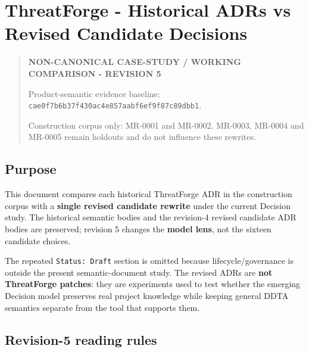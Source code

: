 \documentclass[
  10pt,
]{article}
\author{}
\date{}
\begin{document}
\section{ThreatForge - Historical ADRs vs Revised Candidate
Decisions}\label{threatforge---historical-adrs-vs-revised-candidate-decisions}

\begin{quote}
\textbf{NON-CANONICAL CASE-STUDY / WORKING COMPARISON - REVISION 5}

Product-semantic evidence baseline:
\texttt{cae0f7b6b37f430ac4e857aabf6ef9f87c89dbb1}.

Construction corpus only: MR-0001 and MR-0002. MR-0003, MR-0004 and
MR-0005 remain holdouts and do not influence these rewrites.
\end{quote}

\subsection{Purpose}\label{purpose}

This document compares each historical ThreatForge ADR in the
construction corpus with a \textbf{single revised candidate rewrite}
under the current Decision study. The historical semantic bodies and the
revision-4 revised candidate ADR bodies are preserved; revision 5
changes the \textbf{model lens}, not the sixteen candidate choices.

The repeated \texttt{Status:\ Draft} section is omitted because
lifecycle/governance is outside the present semantic-document study. The
revised ADRs are \textbf{not ThreatForge patches}: they are experiments
used to test whether the emerging Decision model preserves real project
knowledge while keeping general DDTA semantics separate from the tool
that supports them.

\subsection{Revision-5 reading rules}\label{revision-5-reading-rules}
\end{document}
